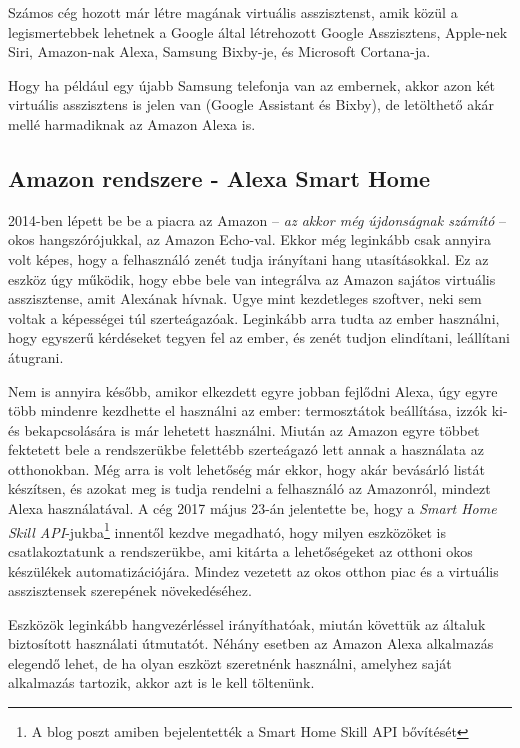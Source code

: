 \documentclass[
]{thesis-ekf}
\theoremstyle{definition}
\theoremstyle{remark}
\begin{document}
	Számos cég hozott már létre magának virtuális asszisztenst, amik közül a legismertebbek lehetnek a Google által létrehozott Google Asszisztens, Apple-nek Siri, Amazon-nak Alexa, Samsung Bixby-je, és Microsoft Cortana-ja.
	
	Hogy ha például egy újabb Samsung telefonja van az embernek, akkor azon két virtuális asszisztens is jelen van (Google Assistant és Bixby), de letölthető akár mellé harmadiknak az Amazon Alexa is.
	
	\subsection{Amazon rendszere - Alexa Smart Home}
	2014-ben lépett be be a piacra az Amazon -- \emph{az akkor még újdonságnak számító} -- okos hangszórójukkal, az Amazon Echo-val. Ekkor még leginkább csak annyira volt képes, hogy a felhasználó zenét tudja irányítani hang utasításokkal. Ez az eszköz úgy működik, hogy ebbe bele van integrálva az Amazon sajátos virtuális asszisztense, amit Alexának hívnak. Ugye mint kezdetleges szoftver, neki sem voltak a képességei túl szerteágazóak. Leginkább arra tudta az ember használni, hogy egyszerű kérdéseket tegyen fel az ember, és zenét tudjon elindítani, leállítani átugrani.
	
	Nem is annyira később, amikor elkezdett egyre jobban fejlődni Alexa, úgy egyre több mindenre kezdhette el használni az ember: termosztátok beállítása, izzók ki- és bekapcsolására is már lehetett használni. Miután az Amazon egyre többet fektetett bele a rendszerükbe felettébb szerteágazó lett annak a használata az otthonokban. Még arra is volt lehetőség már ekkor, hogy akár bevásárló listát készítsen, és azokat meg is tudja rendelni a felhasználó az Amazonról, mindezt Alexa használatával. A cég 2017 május 23-án jelentette be, hogy a \emph{Smart Home Skill API}-jukba\footnote{A blog poszt amiben bejelentették a Smart Home Skill API bővítését\cite{amazon-api}} innentől kezdve megadható, hogy milyen eszközöket is csatlakoztatunk a rendszerükbe, ami kitárta a lehetőségeket az otthoni okos készülékek automatizációjára. Mindez vezetett az okos otthon piac és a virtuális asszisztensek szerepének növekedéséhez.
	
	Eszközök leginkább hangvezérléssel irányíthatóak, miután követtük az általuk biztosított használati útmutatót. Néhány esetben az Amazon Alexa alkalmazás elegendő lehet, de ha olyan eszközt szeretnénk használni, amelyhez saját alkalmazás tartozik, akkor azt is le kell töltenünk.
	
\end{document}
